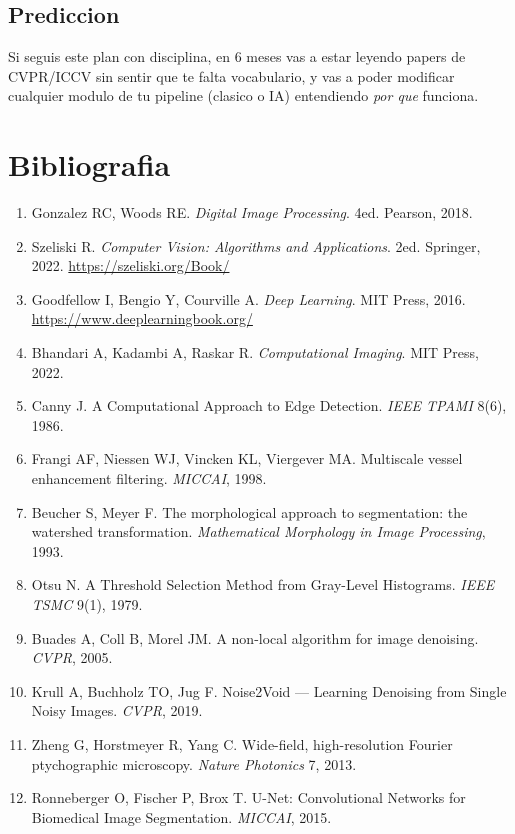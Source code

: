 \documentclass[11pt,a4paper,twoside,openright]{book}
\begin{document}
\section{Prediccion}

Si seguis este plan con disciplina, en 6 meses vas a estar leyendo papers de CVPR/ICCV sin sentir que te falta vocabulario, y vas a poder modificar cualquier modulo de tu pipeline (clasico o IA) entendiendo \emph{por que} funciona.

\chapter*{Bibliografia}

{\footnotesize
\noindent
\begin{enumerate}[leftmargin=2em]
\item Gonzalez RC, Woods RE. \emph{Digital Image Processing}. 4ed. Pearson, 2018.
\item Szeliski R. \emph{Computer Vision: Algorithms and Applications}. 2ed. Springer, 2022. \url{https://szeliski.org/Book/}
\item Goodfellow I, Bengio Y, Courville A. \emph{Deep Learning}. MIT Press, 2016. \url{https://www.deeplearningbook.org/}
\item Bhandari A, Kadambi A, Raskar R. \emph{Computational Imaging}. MIT Press, 2022.
\item Canny J. A Computational Approach to Edge Detection. \emph{IEEE TPAMI} 8(6), 1986.
\item Frangi AF, Niessen WJ, Vincken KL, Viergever MA. Multiscale vessel enhancement filtering. \emph{MICCAI}, 1998.
\item Beucher S, Meyer F. The morphological approach to segmentation: the watershed transformation. \emph{Mathematical Morphology in Image Processing}, 1993.
\item Otsu N. A Threshold Selection Method from Gray-Level Histograms. \emph{IEEE TSMC} 9(1), 1979.
\item Buades A, Coll B, Morel JM. A non-local algorithm for image denoising. \emph{CVPR}, 2005.
\item Krull A, Buchholz TO, Jug F. Noise2Void --- Learning Denoising from Single Noisy Images. \emph{CVPR}, 2019.
\item Zheng G, Horstmeyer R, Yang C. Wide-field, high-resolution Fourier ptychographic microscopy. \emph{Nature Photonics} 7, 2013.
\item Ronneberger O, Fischer P, Brox T. U-Net: Convolutional Networks for Biomedical Image Segmentation. \emph{MICCAI}, 2015.

\end{enumerate}}
\end{document}
